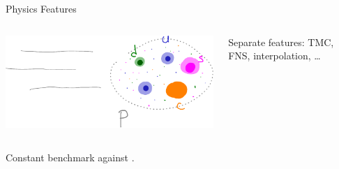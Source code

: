\documentclass[9pt]{beamer}
\begin{document}
\begin{frame}{\yadism{} Physics Features}
    \begin{columns}
        \begin{column}{0.5\textwidth}
            \begin{center}
                \includegraphics[width=0.6\linewidth]{intrinsic}
            \end{center}
        \end{column}
        \begin{column}{0.4\textwidth}
            Separate features: TMC, FNS, interpolation, \dots
        \end{column}
    \end{columns}

    \vspace*{20pt}
	Constant benchmark against \apfel.
\end{frame}
\end{document}
